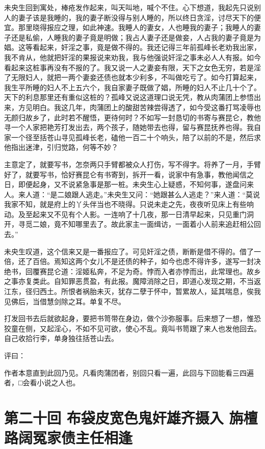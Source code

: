 \documentclass[a4paper,12pt,UTF8,twoside]{ctexbook}
\begin{document}
未央生回到寓处，棒疮发作起来，叫天叫地，喊个不住。心下想道，我起先只说别人的妻子该是我睡的，我的妻子断没得与别人睡的，所以终日贪淫，讨尽天下的便宜。那里晓得报应之理，如此神速。我睡人的妻女，人也睡我的妻子；我睡人的妻子还是私偷，人睡我的妻子竟是明做；我占人妻子还是做妾，人占我的妻子竟是为娼。这等看起来，奸淫之事，竟是做不得的。我还记得三年前孤峰长老劝我出家，我不肯从，他就把奸淫的果报说来劝我，我与他强说奸淫之事未必人人有报。如今看起来这桩事再没有不报的了。我又说一人之妻妾有限，天下之女色无穷，若是淫了无限妇人，就把一两个妻妾还债也就本少利多，不叫做吃亏了。如今打算起来，我生平所睡的妇人不上五六个，我自家妻子既做了娼，所睡的妇人不止几十个了。天下的利息那里还有重似这桩的？孤峰又说这道理口说无凭，教从肉蒲团上参悟出来，方见明白。我这几年，肉蒲团上的酸甜苦辣尝得透了，如今受这番打骂凌辱也无颜归故乡了，此时若不醒悟，更待何时？不如写一封恳切的书寄与赛昆仑，教他寻一个人家把艳芳打发出去，两个孩子，随她带去也得，留与赛昆抚养也得。我自家一个径至括苍山寻见孤峰长老，磕他一百二十个响头，陪了以前的不是，然后求他指出迷津，引归觉路，何等不妙？

主意定了，就要写书，怎奈两只手臂都被众人打伤，写不得字。将养了一月，手臂好了，就要写书，恰好赛昆仑有书寄到，拆开一看，说家中有急事，教他闻信之日，即便起身，又不说紧急事是那一桩。未央生心上疑惑，不知何事，遂盘问来人。来人道：“是二娘跟人逃走。”未央生又问：“她跟甚么人逃走？”来人道：“莫说我家不知，就是府上的丫头伴当也不晓得。只说未走之先，夜夜听见床上有些响动。及至起来又不见有个人影。一连响了十几夜，那一日清早起来，只见重门洞开，寻觅二娘，竟不知哪里去了。故此家主一面缉访，一面着小人前来追赶相公回去。”

未央生叹道，这个信来又是一番报应了。可见奸淫之债，断断是借不得的。借了一倍，还了百倍。焉知这两个女儿不是还债的种子，如今也虑不得许多，遂写一封决绝书，回覆赛昆仑道：淫姬私奔，不足为奇。悖而入者亦悖而出，此常理也。故乡之事亦复类此。自知罪恶贯盈，有此报。魔障消除之日，即道心发现之期，不当返江东，径归西土。所恨者祸胎未灭，犹存二孽于怀中，暂累故人，延其喘息，俟我见佛后，当借慧剑除之耳。单复不尽。

打发回书去后就欲起身，要把书笥带在身边，做个沙弥服事。后来想了一想，惟恐狡童在侧，又起淫心，不如不见可欲，使心不乱。竟叫书笥跟了来人也发他回去。自己收拾行李，单身独往括苍山去。

评曰：

作者本意直到此回乃见。凡看肉蒲团者，别回只看一遍，此回与下回能看三四遍者，□会看小说之人也。

\chapter{第二十回 布袋皮宽色鬼奸雄齐摄入 旃檀路阔冤家债主任相逢}
\end{document}
